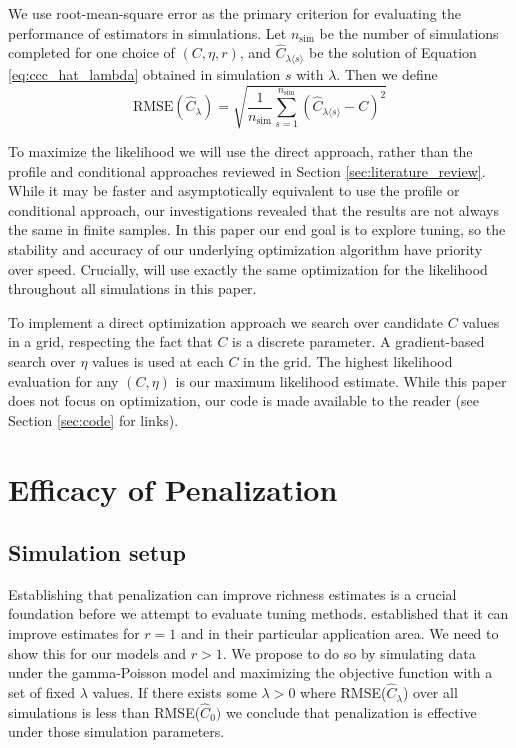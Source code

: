 \documentclass[oupdraft]{bio}
\begin{document}
We use root-mean-square error as the primary criterion for evaluating the performance of estimators in simulations.  Let $n_{\text{sim}}$ be the number of simulations completed for one choice of $(C, \eta, r)$, and $\widehat{C}_{\lambda \langle s \rangle}$ be the solution of Equation \ref{eq:ccc_hat_lambda} obtained in simulation $s$ with  $\lambda$.  Then we define
\begin{equation}
 \text{RMSE}\left( \widehat{C}_{\lambda} \right) = \sqrt{ \frac{1}{n_{\text{sim}}} \sum_{s=1}^{n_{\text{sim}}} \left( \widehat{C}_{\lambda \langle s \rangle} - C\right)^2 }
\end{equation}

To maximize the likelihood we will use the direct approach, rather than the profile and conditional approaches reviewed in Section \ref{sec:literature_review}.  While it may be faster and asymptotically equivalent to use the profile or conditional approach, our investigations revealed that the results are not always the same in finite samples.  In this paper our end goal is to explore tuning, so the stability and accuracy of our underlying optimization algorithm have priority over speed.  Crucially, will use exactly the same optimization for the likelihood throughout all simulations in this paper.

To implement a direct optimization approach we search over candidate $C$ values in a grid, respecting the fact that $C$ is a discrete parameter.  A gradient-based search over $\eta$ values is used at each $C$ in the grid.  The highest likelihood evaluation for any $(C, \eta)$ is our maximum likelihood estimate.  While this paper does not focus on optimization, our code is made available to the reader (see Section \ref{sec:code} for links).

\section{Efficacy of Penalization}
\label{sec:efficacy_sims}
\subsection{Simulation setup}

Establishing that penalization can improve richness estimates is a crucial foundation before we attempt to evaluate tuning methods.  \citet{wang_2005} established that it can improve estimates for $r = 1$ and in their particular application area.  We need to show this for our models and $r > 1$.  We propose to do so by simulating data under the gamma-Poisson model and maximizing the objective function with a set of fixed $\lambda$ values.  If there exists some $\lambda > 0$ where RMSE($\widehat{C}_{\lambda}$) over all simulations is less than RMSE($\widehat{C}_0)$ we conclude that penalization is effective under those simulation parameters.
\end{document}
